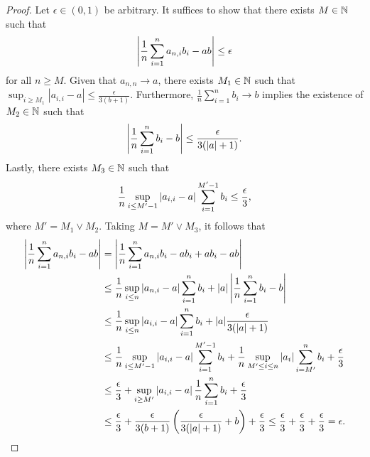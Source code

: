 \begin{proof}
    Let $\epsilon \in (0, 1)$ be arbitrary. It suffices to show that there exists $M\in\mathbb{N}$ such that 
    \begin{align*}
        \left|  \frac{1}{n}\sum_{i=1}^n a_{n, i} b_i - ab\right| \leq \epsilon 
    \end{align*}
    for all $n \geq M$.
    Given that $a_{n, n} \to a$, there exists $M_1 \in \mathbb{N}$ such that $\sup_{i \geq M_1} |a_{i, i}- a| \leq \frac{\epsilon}{3 (b+1)}$. Furthermore, $\frac{1}{n}\sum_{i=1}^n b_i \to b$ implies the existence of $M_2\in\mathbb{N}$ such that
    \begin{align*}
        \left| \frac{1}{n}\sum_{i=1}^n b_i - b \right| \leq \frac{\epsilon}{3 (|a| + 1)}.
    \end{align*}
    Lastly, there exists $M_3 \in\mathbb{N}$ such that
    \begin{align*}
         \frac{1}{n}\sup_{i \leq M'-1}\left| a_{i, i} - a \right| \sum_{i=1}^{M'-1} b_i \leq \frac{\epsilon}{3},
    \end{align*}
    where $M' = M_1 \vee M_2$. Taking $M = M'\vee M_3$, it follows that
    \begin{align*}
        \left|  \frac{1}{n}\sum_{i=1}^n a_{n, i} b_i - ab\right| &= \left|  \frac{1}{n}\sum_{i=1}^n a_{n, i} b_i - ab_i + ab_i - ab\right|
        \\&\leq   \frac{1}{n}\sup_{i \leq n}\left| a_{n, i} - a \right| \sum_{i=1}^n b_i + |a| \left|\frac{1}{n}\sum_{i=1}^n  b_i - b\right|
        \\&\leq   \frac{1}{n}\sup_{i \leq n}\left| a_{i, i} -a\right| \sum_{i=1}^n b_i + |a| \frac{\epsilon}{3 (|a| + 1)}
        \\&\leq   \frac{1}{n}\sup_{i \leq M'-1}\left| a_{i, i} -a\right| \sum_{i=1}^{M'-1} b_i+\frac{1}{n}\sup_{M' \leq i \leq n}\left| a_i \right| \sum_{i=M'}^{n} b_i + \frac{\epsilon}{3}
        \\&\leq   \frac{\epsilon}{3} +\sup_{i \geq M'}\left| a_{i,i}-a \right| \frac{1}{n} \sum_{i=1}^{n} b_i + \frac{\epsilon}{3}
        \\&\leq   \frac{\epsilon}{3} +\frac{\epsilon}{3 (b+1)} \left( \frac{\epsilon}{3 (|a| + 1)} + b\right)  + \frac{\epsilon}{3}
        \leq   \frac{\epsilon}{3} +\frac{\epsilon}{3}  + \frac{\epsilon}{3}
        = \epsilon.
    \end{align*}
\end{proof}


